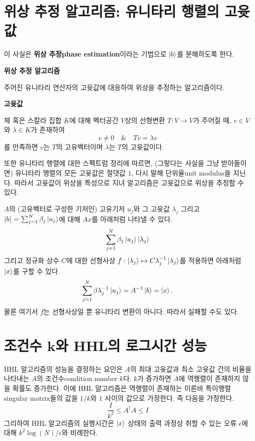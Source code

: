 \documentclass[a4paper,atbegshi,chapter,itemph,hidelinks]{oblivoir}
\begin{document}
\section{위상 추정 알고리즘: 유니타리 행렬의 고윳값}
이 사실은 \textbf{위상 추정\footnotesize phase estimation}이라는 기법으로
$\ket{b}$를 분해하도록 한다.
\begin{mdframed}
  \begin{center}\textbf{위상 추정 알고리즘}\end{center}
  \noindent 주어진 유니타리 연산자의 고윳값에 대응하여 위상을 추정하는
  알고리즘이다. 
  \begin{mdframed}
    \begin{center}\textbf{고윳값}\end{center}
    \noindent 체 혹은 스칼라 집합 $K$에 대해 벡터공간 $V$상의 선형변환
    $T:V\rightarrow V$가 주어질 때, $v\in V$와 $\lambda\in K$가 존재하여
    \[
      v\neq 0\quad\&\quad Tv=\lambda v
    \]
    를 만족하면 $v$는 $T$의 고유벡터이며 $\lambda$는 $T$의 고윳값이다.
  \end{mdframed}
  또한 유니타리 행렬에 대한 스펙트럼 정리에 따르면, (그렇다는 사실을 그냥
  받아들이면) 유니타리 행렬의 모든 고윳값은 절댓값 $1$, 다시 말해 
  단위율{\footnotesize unit modulus}을 지닌다. 따라서 고윳값이 위상을 특성으로
  지녀 알고리즘은 고윳값으로 위상을 추정할 수 있다.
\end{mdframed}
$A$의 (고유벡터로 구성한 기저인) 고유기저 $u_j$와 그 고윳값 $\lambda_j$
그리고 $\ket{b}=\sum_{j=1}^N\beta_j\ket{u_j}$에 대해 $Ax$를 아래처럼 나타낼 수
있다.
\[
  \sum_{j=1}^N\beta_j\ket{u_j}\ket{\lambda_j}
\]
그리고 정규화 상수 $C$에 대한 선형사상 
$f:\ket{\lambda_j}\mapsto C\lambda_j^{-1}\ket{\lambda_j}$를 적용하면 아래처럼
$\ket{x}$를 구할 수 있다.
\[
  \sum_{j=1}^N\beta\lambda_j^{-1}\ket{u_j}=A^{-1}\ket{b}=\ket{x}.
\]
물론 여기서 $f$는 선형사상일 뿐 유니타리 변환이 아니다. 따라서 실패할 수도 있다.
\section{조건수 $\pmb{k}$와 HHL의 로그시간 성능}
HHL 알고리즘의 성능을 결정하는 요인은 $A$의 최대 고윳값과 최소 고윳값 간의
비율을 나타내는 $A$의 조건수{\footnotesize condition number} $k$다. $k$가 증가하면
$A$에 역행렬이 존재하지 않을 확률도 증가한다. 이에 HHL 알고리즘은
역행렬이 존재하는 이른바 특이행렬{\footnotesize singular matrix}들의 값을
$1/k$와 $1$ 사이의 값으로 가정한다. 즉 다음을 가정한다.
\[
  \frac{I}{k^2}\leq A^{\dagger}A \leq I
\]
그리하여 HHL 알고리즘의 실행시간은 $\ket{x}$ 상태의 출력 과정상 취할 수 있는
오류 $\epsilon$에 대해 $k^2\log(N)/\epsilon$와 비례한다.
\end{document}

